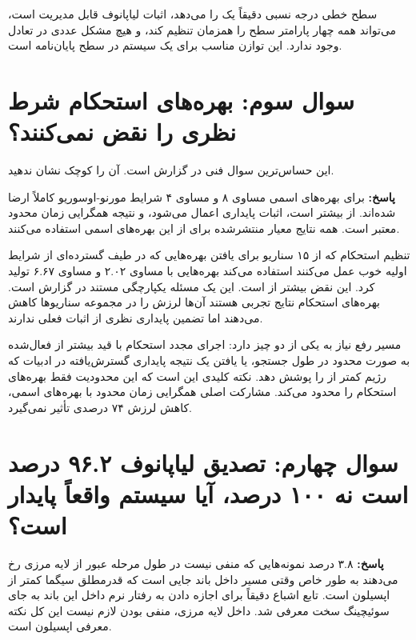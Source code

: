 \documentclass[12pt, a4paper]{article}
\newcommand{\dash}{\lr{---}}
\begin{document}
سطح خطی درجه نسبی دقيقاً يک را می‌دهد، اثبات لياپانوف قابل مديريت است،  می‌تواند همه چهار پارامتر سطح را همزمان تنظيم کند، و هيچ مشکل عددی در تعادل وجود ندارد. اين توازن مناسب برای يک سيستم در سطح پايان‌نامه است.

\section{سوال سوم: بهره‌های استحکام  شرط نظری را نقض نمی‌کنند؟}

اين حساس‌ترين سوال فنی در گزارش است. آن را کوچک نشان ندهيد.

\textbf{پاسخ:} برای بهره‌های اسمی  \dash{}  مساوی ۸ و  مساوی ۴ \dash{} شرايط مورنو-اوسوريو کاملاً ارضا شده‌اند.  از  بيشتر است، اثبات پايداری اعمال می‌شود، و نتيجه همگرايی زمان محدود معتبر است. همه نتايج معيار منتشرشده برای  از اين بهره‌های اسمی استفاده می‌کنند.

 تنظيم استحکام \dash{} که از ۱۵ سناريو برای يافتن بهره‌هايی که در طيف گسترده‌ای از شرايط اوليه خوب عمل می‌کنند استفاده می‌کند \dash{} بهره‌هايی با  مساوی ۲.۰۲ و  مساوی ۶.۶۷ توليد کرد. اين نقض  بيشتر از  است. اين يک مسئله يکپارچگی مستند در گزارش است. بهره‌های استحکام نتايج تجربی هستند \dash{} آن‌ها لرزش را در مجموعه سناريوها کاهش می‌دهند \dash{} اما تضمين پايداری نظری از اثبات فعلی ندارند.

مسير رفع نياز به يکی از دو چيز دارد: اجرای مجدد  استحکام با قيد  بيشتر از  فعال‌شده به صورت محدود در طول جستجو، يا يافتن يک نتيجه پايداری گسترش‌يافته در ادبيات که رژيم  کمتر از  را پوشش دهد. نکته کليدی اين است که اين محدوديت فقط بهره‌های استحکام را محدود می‌کند. مشارکت اصلی  \dash{} همگرايی زمان محدود با بهره‌های اسمی، کاهش لرزش ۷۴ درصدی \dash{} تأثير نمی‌گيرد.

\section{سوال چهارم: تصديق لياپانوف ۹۶.۲ درصد است نه ۱۰۰ درصد، آيا سيستم واقعاً پايدار است؟}

\textbf{پاسخ:} ۳.۸ درصد نمونه‌هايی که  منفی نيست در طول مرحله عبور از لايه مرزی رخ می‌دهند \dash{} به طور خاص وقتی مسير داخل باند جايی است که قدرمطلق سيگما کمتر از اپسيلون است. تابع اشباع دقيقاً برای اجازه دادن به رفتار نرم داخل اين باند به جای سوئيچينگ سخت معرفی شد. داخل لايه مرزی،  منفی بودن لازم نيست \dash{} اين کل نکته معرفی اپسيلون است.
\end{document}
